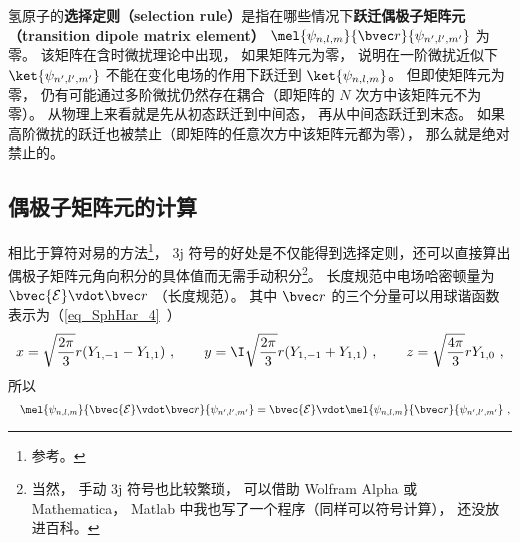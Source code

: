 

氢原子的\textbf{选择定则（selection rule）}是指在哪些情况下\textbf{跃迁偶极子矩阵元（transition dipole matrix element）} $\mel{\psi_{n,l,m}}{\bvec r}{\psi_{n',l',m'}}$ 为零。 该矩阵在含时微扰理论中出现， 如果矩阵元为零， 说明在一阶微扰近似下 $\ket{\psi_{n',l',m'}}$ 不能在变化电场的作用下跃迁到 $\ket{\psi_{n,l,m}}$。 但即使矩阵元为零， 仍有可能通过多阶微扰仍然存在耦合（即矩阵的 $N$ 次方中该矩阵元不为零）。 从物理上来看就是先从初态跃迁到中间态， 再从中间态跃迁到末态。 如果高阶微扰的跃迁也被禁止（即矩阵的任意次方中该矩阵元都为零）， 那么就是绝对禁止的。 %

\subsection{偶极子矩阵元的计算}
相比于算符对易的方法\footnote{参考\cite{GriffQ}。}， 3j 符号的好处是不仅能得到选择定则，还可以直接算出偶极子矩阵元角向积分的具体值而无需手动积分\footnote{当然， 手动 3j 符号也比较繁琐， 可以借助 Wolfram Alpha 或 Mathematica， Matlab 中我也写了一个程序（同样可以符号计算）， 还没放进百科。}。 长度规范中电场哈密顿量为 $\bvec{\mathcal{E}}\vdot \bvec r$ （长度规范）。 其中 $\bvec r$ 的三个分量可以用球谐函数表示为（\autoref{eq_SphHar_4}~）
\begin{equation}
x = \sqrt{\frac{2\pi}{3}} r (Y_{1,-1} - Y_{1,1})~, \qquad
y = \I \sqrt{\frac{2\pi}{3}} r (Y_{1,-1}+Y_{1,1})~, \qquad
z = \sqrt{\frac{4\pi}{3}} rY_{1,0}~,
\end{equation}
所以
\begin{equation}\label{eq_SelRul_3}
\quad\mel{\psi_{n,l,m}}{\bvec{\mathcal E}\vdot\bvec r}{\psi_{n',l',m'}} = \bvec{\mathcal E}\vdot\mel{\psi_{n,l,m}}{\bvec r}{\psi_{n',l',m'}}~,
\end{equation}

